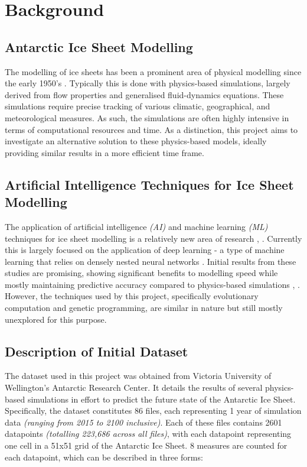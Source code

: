\chapter{Background}\label{C:background}

\section{Antarctic Ice Sheet Modelling}

The modelling of ice sheets has been a prominent area of physical modelling since the early 1950's \cite{Blatter2010}. Typically this is done with physics-based simulations, largely derived from flow properties and generalised fluid-dynamics equations. These simulations require precise tracking of various climatic, geographical, and meteorological measures. As such, the simulations are often highly intensive in terms of computational resources and time. As a distinction, this project aims to investigate an alternative solution to these physics-based models, ideally providing similar results in a more efficient time frame.

\section{Artificial Intelligence Techniques for Ice Sheet Modelling}

The application of artificial intelligence \textit{(AI)} and machine learning \textit{(ML)} techniques for ice sheet modelling is a relatively new area of research \cite{Dungate2021}, \cite{Vir2024}.  Currently this is largely focused on the application of deep learning - a type of machine learning that relies on densely nested neural networks \cite{Rosier2023}.  Initial results from these studies are promising, showing significant benefits to modelling speed while mostly maintaining predictive accuracy compared to physics-based simulations \cite{Jouvet2021}, \cite{Verjans2024}. However, the techniques used by this project, specifically evolutionary computation and genetic programming, are similar in nature but still mostly unexplored for this purpose.

 \section{Description of Initial Dataset}\label{S:description_dataset}

The dataset used in this project was obtained from Victoria University of Wellington's Antarctic Research Center. It details the results of several physics-based simulations in effort to predict the future state of the Antarctic Ice Sheet. Specifically, the dataset constitutes 86 files, each representing 1 year of simulation data \textit{(ranging from 2015 to 2100 inclusive)}. Each of these files contains 2601 datapoints \textit{(totalling 223,686 across all files)}, with each datapoint representing one cell in  a 51x51 grid of the Antarctic Ice Sheet. 8 measures are counted for each datapoint, which can be described in three forms:


